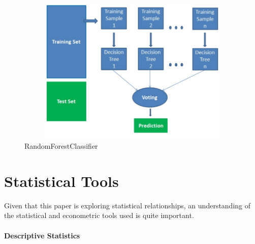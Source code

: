 \begin{itemize}
    \begin{figure}[h!]
        \centering
        \includegraphics[width=15cm,height=7cm,keepaspectratio]{implementation/randomForest.png}
        \caption{RandomForestClassifier}
        \label{fig:randomForest}
    \end{figure}
\end{itemize}

\section{Statistical Tools}

Given that this paper is exploring statistical relationships, an understanding of the statistical and econometric tools used is quite important.

\paragraph{Descriptive Statistics}

